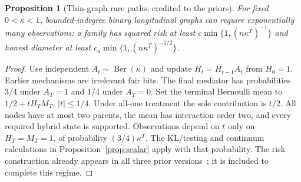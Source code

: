 \documentclass[11pt,a4paper]{article}
\numberwithin{equation}{section}
\newtheorem{proposition}[theorem]{Proposition}
\theoremstyle{definition}
\begin{document}
\begin{proposition}[Thin-graph rare paths, credited to the priors]\label{prop:rarepath}
For fixed $0<\kappa<1$, bounded-indegree binary longitudinal graphs
can require exponentially many observations: a family has squared risk
at least $c\min\{1,(n\kappa^T)^{-1}\}$ and honest diameter at least
$c_a\min\{1,(n\kappa^T)^{-1/2}\}$.
\end{proposition}
\begin{proof}
Use independent $A_t\sim\operatorname{Ber}(\kappa)$ and update
$H_t=H_{t-1}A_t$ from $H_0=1$. Earlier mechanisms are irrelevant fair
bits. The final mediator has probabilities $3/4$ under $A_T=1$ and
$1/4$ under $A_T=0$. Set the terminal Bernoulli mean to
$1/2+tH_TM_T$, $|t|\le1/4$. Under all-one treatment the sole contribution
is $t/2$. All nodes have at most two parents, the mean has interaction
order two, and every required hybrid state is supported. Observations
depend on $t$ only on $H_T=M_T=1$, of probability
$(3/4)\kappa^T$. The KL/testing and continuum calculations in
Proposition~\ref{prop:scalar} apply with that probability. The risk
construction already appears in all three prior versions~\cite{prior};
it is included to complete this regime.
\end{proof}
\end{document}
